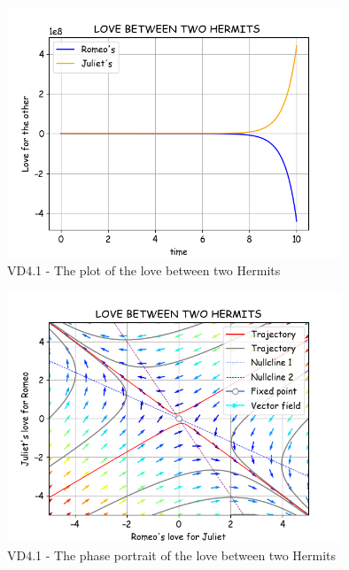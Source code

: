 \pagebreak
\begin{figure}[!htbp]
    \centering
    \includegraphics[width=100mm]{image/bt2/plot4.1.png}
    \caption{VD4.1 - The plot of the love between two Hermits }
\end{figure}
\begin{figure}[!htbp]
    \centering
    \includegraphics[width=100mm]{image/bt2/pp4.1.png}
    \caption{VD4.1 - The phase portrait of the love between two Hermits}
\end{figure}

